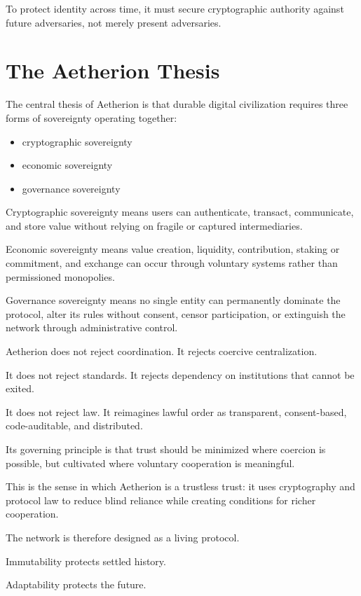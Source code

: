 ﻿\documentclass[12pt]{article}
\begin{document}
To protect identity across time, it must secure cryptographic authority against future adversaries, not merely present adversaries.

\section{The Aetherion Thesis}


The central thesis of Aetherion is that durable digital civilization requires three forms of sovereignty operating together:

\begin{itemize}
  \item cryptographic sovereignty
  \item economic sovereignty
  \item governance sovereignty
\end{itemize}

Cryptographic sovereignty means users can authenticate, transact, communicate, and store value without relying on fragile or captured intermediaries.

Economic sovereignty means value creation, liquidity, contribution, staking or commitment, and exchange can occur through voluntary systems rather than permissioned monopolies.

Governance sovereignty means no single entity can permanently dominate the protocol, alter its rules without consent, censor participation, or extinguish the network through administrative control.

Aetherion does not reject coordination. It rejects coercive centralization.

It does not reject standards. It rejects dependency on institutions that cannot be exited.

It does not reject law. It reimagines lawful order as transparent, consent-based, code-auditable, and distributed.

Its governing principle is that trust should be minimized where coercion is possible, but cultivated where voluntary cooperation is meaningful.

This is the sense in which Aetherion is a trustless trust: it uses cryptography and protocol law to reduce blind reliance while creating conditions for richer cooperation.

The network is therefore designed as a living protocol.

Immutability protects settled history.

Adaptability protects the future.
\end{document}
